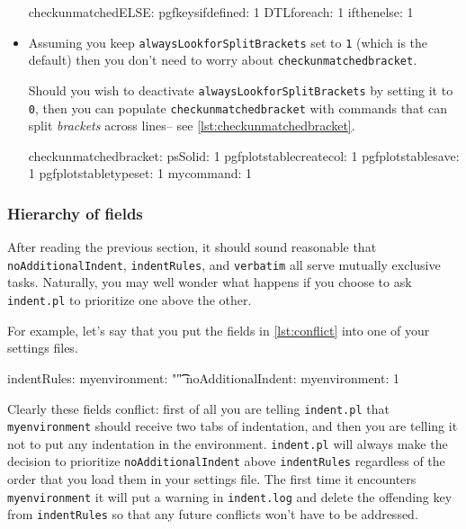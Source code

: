 \begin{itemize}
	\begin{yaml}[caption={\lstinline!checkunmatchedELSE!},label={lst:checkunmatchedELSE}]
checkunmatchedELSE:
    pgfkeysifdefined: 1
    DTLforeach: 1
    ifthenelse: 1
	\end{yaml}
	\item[\color{red}\verbitem{checkunmatchedbracket}] Assuming you keep \lstinline!alwaysLookforSplitBrackets! 
	set to \lstinline!1! (which is the default) then you don't need to worry about \lstinline!checkunmatchedbracket!. 
						 		 		 		 		 					
	Should you wish to deactivate \lstinline!alwaysLookforSplitBrackets! by setting it 
	to \lstinline!0!, then you can populate \lstinline!checkunmatchedbracket! with commands that can 
	split \emph{brackets} across lines-- see \cref{lst:checkunmatchedbracket}.
						 		 		 		 		 					
	\begin{yaml}[caption={\lstinline!checkunmatchedbracket!},label={lst:checkunmatchedbracket}]
checkunmatchedbracket:
    psSolid: 1
    pgfplotstablecreatecol: 1
    pgfplotstablesave: 1
    pgfplotstabletypeset: 1
    mycommand: 1
	\end{yaml}
\end{itemize}
 	 	 	 	 	
\subsubsection{Hierarchy of fields}\label{sec:fieldhierachy}
After reading the previous section, it should sound reasonable that 
\lstinline!noAdditionalIndent!, \lstinline!indentRules!, and 
\lstinline!verbatim! all serve mutually exclusive tasks. Naturally, you may 
well wonder what happens if you choose to ask \lstinline!indent.pl! to 
prioritize one above the other.
 	 	 	 	 	
For example, let's say that you put the fields in \cref{lst:conflict} into 
one of your settings files.  
\begin{yaml}[caption={Conflicting ideas},label={lst:conflict}]
indentRules:
   myenvironment: "\t\t"
noAdditionalIndent:
   myenvironment: 1
\end{yaml}
 	 	 	 	 	
Clearly these fields conflict: first of all 
you are telling \lstinline!indent.pl! that \lstinline!myenvironment! should 
receive two tabs of indentation, and then you are telling it 
not to put any indentation in the environment. \lstinline!indent.pl!
will always make the decision to prioritize \lstinline!noAdditionalIndent! above
\lstinline!indentRules! regardless of the order that you load them in 
your settings file. The first 
time it encounters \lstinline!myenvironment! it will put a warning in \lstinline!indent.log!
and delete the offending key from \lstinline!indentRules! so that any future 
conflicts won't have to be addressed.
 	 	 	 	 	
